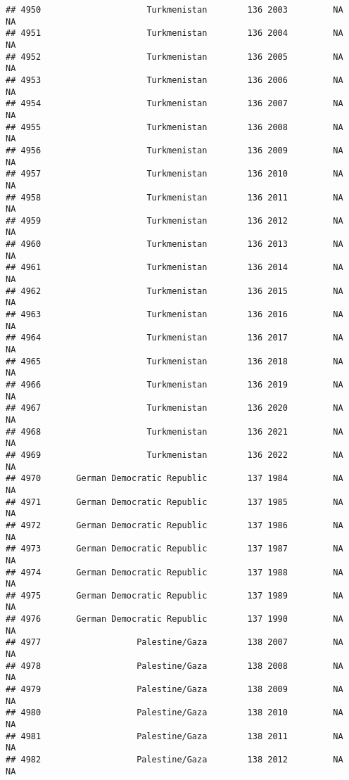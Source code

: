 \documentclass[
]{article}
\begin{document}
\begin{verbatim}
## 4950                     Turkmenistan        136 2003         NA         NA
## 4951                     Turkmenistan        136 2004         NA         NA
## 4952                     Turkmenistan        136 2005         NA         NA
## 4953                     Turkmenistan        136 2006         NA         NA
## 4954                     Turkmenistan        136 2007         NA         NA
## 4955                     Turkmenistan        136 2008         NA         NA
## 4956                     Turkmenistan        136 2009         NA         NA
## 4957                     Turkmenistan        136 2010         NA         NA
## 4958                     Turkmenistan        136 2011         NA         NA
## 4959                     Turkmenistan        136 2012         NA         NA
## 4960                     Turkmenistan        136 2013         NA         NA
## 4961                     Turkmenistan        136 2014         NA         NA
## 4962                     Turkmenistan        136 2015         NA         NA
## 4963                     Turkmenistan        136 2016         NA         NA
## 4964                     Turkmenistan        136 2017         NA         NA
## 4965                     Turkmenistan        136 2018         NA         NA
## 4966                     Turkmenistan        136 2019         NA         NA
## 4967                     Turkmenistan        136 2020         NA         NA
## 4968                     Turkmenistan        136 2021         NA         NA
## 4969                     Turkmenistan        136 2022         NA         NA
## 4970       German Democratic Republic        137 1984         NA         NA
## 4971       German Democratic Republic        137 1985         NA         NA
## 4972       German Democratic Republic        137 1986         NA         NA
## 4973       German Democratic Republic        137 1987         NA         NA
## 4974       German Democratic Republic        137 1988         NA         NA
## 4975       German Democratic Republic        137 1989         NA         NA
## 4976       German Democratic Republic        137 1990         NA         NA
## 4977                   Palestine/Gaza        138 2007         NA         NA
## 4978                   Palestine/Gaza        138 2008         NA         NA
## 4979                   Palestine/Gaza        138 2009         NA         NA
## 4980                   Palestine/Gaza        138 2010         NA         NA
## 4981                   Palestine/Gaza        138 2011         NA         NA
## 4982                   Palestine/Gaza        138 2012         NA         NA

\end{verbatim}
\end{document}
